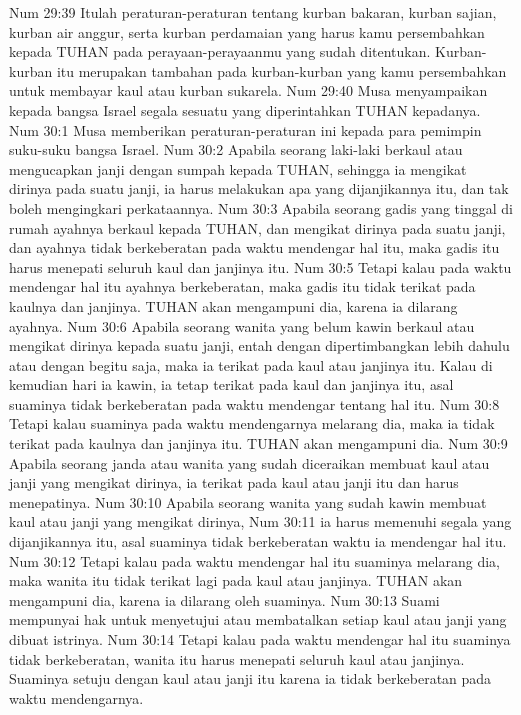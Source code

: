 Num 29:39  Itulah peraturan-peraturan tentang kurban bakaran, kurban sajian, kurban air anggur, serta kurban perdamaian yang harus kamu persembahkan kepada TUHAN pada perayaan-perayaanmu yang sudah ditentukan. Kurban-kurban itu merupakan tambahan pada kurban-kurban yang kamu persembahkan untuk membayar kaul atau kurban sukarela.
Num 29:40  Musa menyampaikan kepada bangsa Israel segala sesuatu yang diperintahkan TUHAN kepadanya.
Num 30:1  Musa memberikan peraturan-peraturan ini kepada para pemimpin suku-suku bangsa Israel.
Num 30:2  Apabila seorang laki-laki berkaul atau mengucapkan janji dengan sumpah kepada TUHAN, sehingga ia mengikat dirinya pada suatu janji, ia harus melakukan apa yang dijanjikannya itu, dan tak boleh mengingkari perkataannya.
Num 30:3  Apabila seorang gadis yang tinggal di rumah ayahnya berkaul kepada TUHAN, dan mengikat dirinya pada suatu janji, dan ayahnya tidak berkeberatan pada waktu mendengar hal itu, maka gadis itu harus menepati seluruh kaul dan janjinya itu.
Num 30:5  Tetapi kalau pada waktu mendengar hal itu ayahnya berkeberatan, maka gadis itu tidak terikat pada kaulnya dan janjinya. TUHAN akan mengampuni dia, karena ia dilarang ayahnya.
Num 30:6  Apabila seorang wanita yang belum kawin berkaul atau mengikat dirinya kepada suatu janji, entah dengan dipertimbangkan lebih dahulu atau dengan begitu saja, maka ia terikat pada kaul atau janjinya itu. Kalau di kemudian hari ia kawin, ia tetap terikat pada kaul dan janjinya itu, asal suaminya tidak berkeberatan pada waktu mendengar tentang hal itu.
Num 30:8  Tetapi kalau suaminya pada waktu mendengarnya melarang dia, maka ia tidak terikat pada kaulnya dan janjinya itu. TUHAN akan mengampuni dia.
Num 30:9  Apabila seorang janda atau wanita yang sudah diceraikan membuat kaul atau janji yang mengikat dirinya, ia terikat pada kaul atau janji itu dan harus menepatinya.
Num 30:10  Apabila seorang wanita yang sudah kawin membuat kaul atau janji yang mengikat dirinya,
Num 30:11  ia harus memenuhi segala yang dijanjikannya itu, asal suaminya tidak berkeberatan waktu ia mendengar hal itu.
Num 30:12  Tetapi kalau pada waktu mendengar hal itu suaminya melarang dia, maka wanita itu tidak terikat lagi pada kaul atau janjinya. TUHAN akan mengampuni dia, karena ia dilarang oleh suaminya.
Num 30:13  Suami mempunyai hak untuk menyetujui atau membatalkan setiap kaul atau janji yang dibuat istrinya.
Num 30:14  Tetapi kalau pada waktu mendengar hal itu suaminya tidak berkeberatan, wanita itu harus menepati seluruh kaul atau janjinya. Suaminya setuju dengan kaul atau janji itu karena ia tidak berkeberatan pada waktu mendengarnya.
